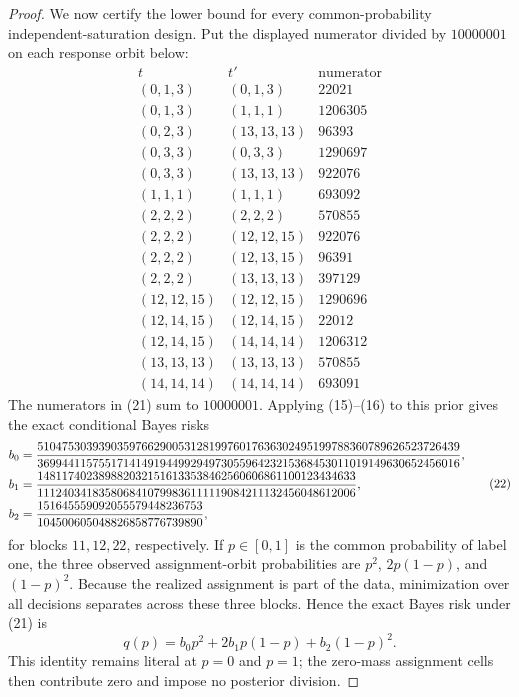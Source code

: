 \documentclass{article}
\begin{document}
\begin{proof}
We now certify the lower bound for every common-probability independent-saturation design.  Put the displayed numerator divided by \(10000001\) on each response orbit below:
\[
\begin{array}{c|c|r}
t&t'&\text{numerator}\\ \hline
(0,1,3)&(0,1,3)&22021\\
(0,1,3)&(1,1,1)&1206305\\
(0,2,3)&(13,13,13)&96393\\
(0,3,3)&(0,3,3)&1290697\\
(0,3,3)&(13,13,13)&922076\\
(1,1,1)&(1,1,1)&693092\\
(2,2,2)&(2,2,2)&570855\\
(2,2,2)&(12,12,15)&922076\\
(2,2,2)&(12,13,15)&96391\\
(2,2,2)&(13,13,13)&397129\\
(12,12,15)&(12,12,15)&1290696\\
(12,14,15)&(12,14,15)&22012\\
(12,14,15)&(14,14,14)&1206312\\
(13,13,13)&(13,13,13)&570855\\
(14,14,14)&(14,14,14)&693091
\end{array}                                                                 \tag{21}
\]
The numerators in (21) sum to \(10000001\).  Applying (15)--(16) to this prior gives the exact conditional Bayes risks
\[
\begin{split}
b_0&={510475303939035976629005312819976017636302495199788360789626523726439
\over369944115755171414919449929497305596423215368453011019149630652456016},\\
b_1&={1481174023898820321516133538462560606861100123434633
\over1112403418358068410799836111119084211132456048612006},\\
b_2&={151645559092055579448236753
\over104500605048826858776739890},
\end{split}                                                                 \tag{22}
\]
for blocks \(11,12,22\), respectively.  If \(p\in[0,1]\) is the common probability of label one, the three observed assignment-orbit probabilities are \(p^2\), \(2p(1-p)\), and \((1-p)^2\).  Because the realized assignment is part of the data, minimization over all decisions separates across these three blocks.  Hence the exact Bayes risk under (21) is
\[
q(p)=b_0p^2+2b_1p(1-p)+b_2(1-p)^2.                                        \tag{23}
\]
This identity remains literal at \(p=0\) and \(p=1\); the zero-mass assignment cells then contribute zero and impose no posterior division.


\end{proof}
\end{document}

